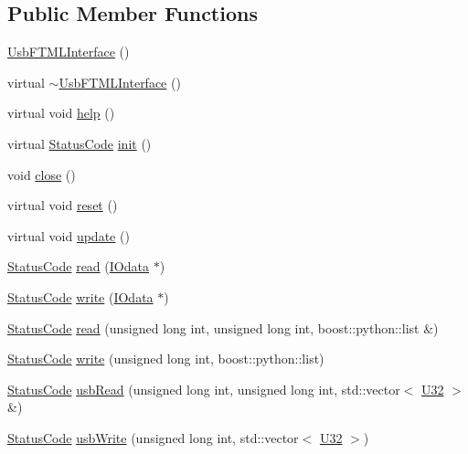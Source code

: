 \subsection*{Public Member Functions}
\begin{DoxyCompactItemize}
\item 
\hyperlink{classUsbFTMLInterface_aeb03292247ac4f7af188836b5c961f5d}{UsbFTMLInterface} ()
\item 
virtual \hyperlink{classUsbFTMLInterface_a0bf44726e717235861347e61ac76a799}{$\sim$UsbFTMLInterface} ()
\item 
virtual void \hyperlink{classUsbFTMLInterface_a1cfe65c58531afc07c21d876e21d8e46}{help} ()
\item 
virtual \hyperlink{classStatusCode}{StatusCode} \hyperlink{classUsbFTMLInterface_a7f7c96ece97e607b88425823a2923a43}{init} ()
\item 
void \hyperlink{classUsbFTMLInterface_a1eaa27bd62bc381f60aa837f70a70117}{close} ()
\item 
virtual void \hyperlink{classUsbFTMLInterface_a1e53e5a0453e9aa731d1ec07aacbc8ab}{reset} ()
\item 
virtual void \hyperlink{classUsbFTMLInterface_a941ba5a5c0f398e5d26c97bb4111510d}{update} ()
\item 
\hyperlink{classStatusCode}{StatusCode} \hyperlink{classUsbFTMLInterface_a9999929c6169c8b4ebe57b687b2dac28}{read} (\hyperlink{classIOdata}{IOdata} $\ast$)
\item 
\hyperlink{classStatusCode}{StatusCode} \hyperlink{classUsbFTMLInterface_aa801e8875661d73b2afe25cb1fb94a94}{write} (\hyperlink{classIOdata}{IOdata} $\ast$)
\item 
\hyperlink{classStatusCode}{StatusCode} \hyperlink{classUsbFTMLInterface_ae36cbbc258c8fc13b6c63f61bed4a8dc}{read} (unsigned long int, unsigned long int, boost::python::list \&)
\item 
\hyperlink{classStatusCode}{StatusCode} \hyperlink{classUsbFTMLInterface_a151203f73f3e052a20ffc5809f2d6318}{write} (unsigned long int, boost::python::list)
\item 
\hyperlink{classStatusCode}{StatusCode} \hyperlink{classUsbFTMLInterface_adbedf78154f460303edc20420c22c333}{usbRead} (unsigned long int, unsigned long int, std::vector$<$ \hyperlink{classUsbFTMLInterface_a142f8ce4b5873c295af8945f3894ae38}{U32} $>$ \&)
\item 
\hyperlink{classStatusCode}{StatusCode} \hyperlink{classUsbFTMLInterface_a24eed1c8e7ba38e8a997aeff8b0e0a51}{usbWrite} (unsigned long int, std::vector$<$ \hyperlink{classUsbFTMLInterface_a142f8ce4b5873c295af8945f3894ae38}{U32} $>$)

\end{DoxyCompactItemize}
